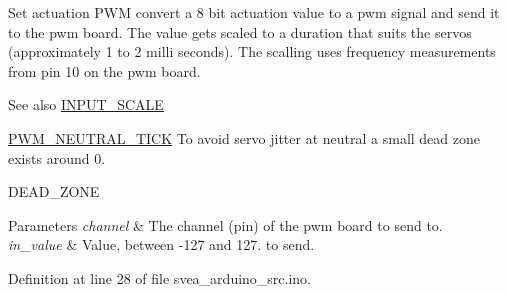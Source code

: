 Set actuation P\+WM convert a 8 bit actuation value to a pwm signal and send it to the pwm board. The value gets scaled to a duration that suits the servos (approximately 1 to 2 milli seconds). The scalling uses frequency measurements from pin 10 on the pwm board. 

\begin{DoxySeeAlso}{See also}
\hyperlink{group__ActuationToOutput_ga8e7323c31db382601e81947c2bba345b}{I\+N\+P\+U\+T\+\_\+\+S\+C\+A\+LE} 

\hyperlink{group__ActuationToOutput_gaa6aecad7bb848a436df0b7c89aa1f48f}{P\+W\+M\+\_\+\+N\+E\+U\+T\+R\+A\+L\+\_\+\+T\+I\+CK} To avoid servo jitter at neutral a small dead zone exists around 0. 

D\+E\+A\+D\+\_\+\+Z\+O\+NE 
\end{DoxySeeAlso}

\begin{DoxyParams}{Parameters}
{\em channel} & The channel (pin) of the pwm board to send to. \\
\hline
{\em in\+\_\+value} & Value, between -\/127 and 127. to send. \\
\hline
\end{DoxyParams}


Definition at line 28 of file svea\+\_\+arduino\+\_\+src.\+ino.

